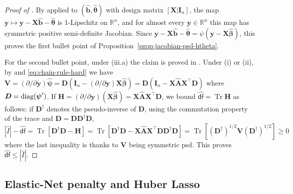 \documentclass[11pt]{amsart}
\numberwithin{equation}{section}
\numberwithin{equation}{section}
\def\real{{\mathbb{R}}}
\def\R{{\real}}
\def\diag{\hbox{\rm diag}}
\DeclareMathOperator{\trace}{Tr}
\def\mathbold{\boldsymbol} %
\def\bA{\mathbold{A}}\def\calA{{\cal A}}\def\scrA{{\mathscr A}}\def\Ahat{\widehat{A}}\def\Atil{{\widetilde A}}
\def\hbA{{\widehat{\bA}}}\def\tbA{{\widetilde{\bA}}}
\def\bb{\mathbold{b}}\def\bhat{\widehat{b}}\def\btil{\widetilde{b}}
\def\hbb{{\widehat{\bb}}}\def\tbb{{\widetilde{\bb}}}\def\bbbar{{\overline \bb}}
\def\bD{\mathbold{D}}\def\calD{{\cal D}}\def\scrD{{\mathscr D}}\def\Dhat{\widehat{D}}\def\Dtil{{\widetilde D}}
\def\bH{{\mathbold{H}}}\def\calH{{\cal H}}\def\scrH{{\mathscr H}}\def\Hhat{\widehat{H}}\def\Htil{{\widetilde H}}
\def\bI{\mathbold{I}}\def\hbI{{\widehat{\bI}}}\def\tbI{{\widetilde{\bI}}}
\def\bV{\mathbold{V}}\def\hbV{{\widehat{\bV}}}\def\tbV{{\widetilde{\bV}}}
\def\bX{\mathbold{X}}\def\hbX{{\widehat{\bX}}}\def\tbX{{\widetilde{\bX}}}\def\bXbar{{\overline \bX}}
\def\by{\mathbold{y}}\def\yhat{\widehat{y}}\def\ytil{\widetilde{y}}\def\ybar{{\overline y}}\def\vby{{\bf y}}
\def\bbeta{\mathbold{\beta}}\def\betahat{\widehat{\beta}}\def\hbeta{\widehat{\beta}}
\def\hbbeta{{{\widehat{\bbeta}}}}
\def\btheta{\mathbold{\theta}}\def\thetahat{\widehat{\theta}}\def\htheta{\widehat{\theta}}
\def\hbtheta{{\widehat{\btheta}}}\def\tbtheta{{\widetilde{\btheta}}}
\def\bpsi{\mathbold{\psi}}\def\psihat{\widehat{\psi}}\def\hpsi{\widehat{\psi}}
\def\hbpsi{{\widehat{\bpsi}}}\def\tbpsi{{\widetilde{\bpsi}}}
\def\calD{{\cal D}}
\def\df{{\hat{\mathsf{df}}}{}}
\begin{document}
\begin{proof}[Proof of ]
    By \cite[Proposition J.1]{bellec_zhang2019second_poincare}
    applied to $(\hbb,\hbtheta)$ with design matrix
    $[\bX|\bI_n]$, the map
    $\by\mapsto \by-\bX\hbb - \hbtheta$ is 1-Lipschitz on $\R^n$,
    and for almost every $\by\in\R^n$ this map has
    symmetric positive semi-definite Jacobian.
    Since $\by-\bX\hbb - \hbtheta = \psi(\by-\bX\hbbeta)$,
    this proves the first bullet point
    of Proposition~\ref{prop:jacobian-psd-htheta}.

    For the second bullet point, under (iii.a)
    the claim is proved in .
    Under (i) or (ii),
    by 
    and \eqref{eq:chain-rule-hard} we have
    $\bV = (\partial/\partial\by)\hbpsi=
    \bD(\bI_n - (\partial/\partial\by)\bX\hbbeta)
    =
    \bD(\bI_n-\bX\hbA\bX^\top\bD)$
    where $\bD=\diag(\bpsi')$.
    If $\bH = (\partial/\partial\by)(\bX\hbbeta) = \bX\hbA\bX^\top\bD$,
    we bound $\df=\trace\bH$ as follows:
    if $\bD^\dagger$ denotes the pseudo-inverse of $\bD$,
    using the commutation property of the trace and $\bD=\bD\bD^\dagger\bD$,
    $$|\hat I| - \df=
    \trace[\bD^\dagger \bD - \bH]
    =
    \trace[\bD^\dagger \bD - \bX\hbA\bX^\top\bD\bD^\dagger\bD]
    = \trace[
    (\bD^\dagger)^{1/2} \bV (\bD^\dagger)^{1/2}
    ]\ge 0
    $$
    where the last inequality is thanks to $\bV$ being symmetric psd.
    This proves $\df\le |\hat I|$.
\end{proof}

\subsection{Elastic-Net penalty and Huber Lasso}
\label{proof:ENet-Huber-Lasso}
\end{document}
